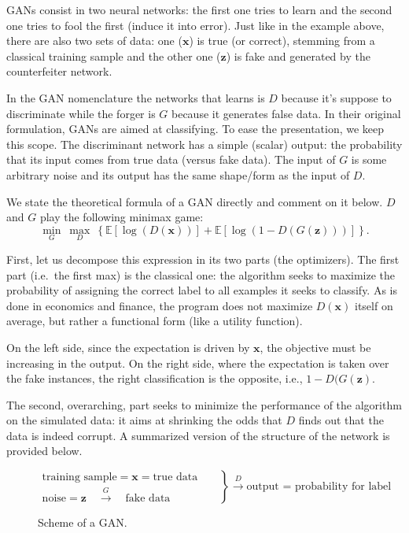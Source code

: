 \documentclass[]{krantz}
\theoremstyle{definition}
\theoremstyle{definition}
\theoremstyle{definition}
\theoremstyle{remark}
\begin{document}
GANs consist in two neural networks: the first one tries to learn and
the second one tries to fool the first (induce it into error). Just like
in the example above, there are also two sets of data: one
(\(\textbf{x}\)) is true (or correct), stemming from a classical
training sample and the other one (\(\textbf{z}\)) is fake and generated
by the counterfeiter network.

In the GAN nomenclature the networks that learns is \(D\) because it's
suppose to discriminate while the forger is \(G\) because it generates
false data. In their original formulation, GANs are aimed at
classifying. To ease the presentation, we keep this scope. The
discriminant network has a simple (scalar) output: the probability that
its input comes from true data (versus fake data). The input of \(G\) is
some arbitrary noise and its output has the same shape/form as the input
of \(D\).

We state the theoretical formula of a GAN directly and comment on it
below. \(D\) and \(G\) play the following minimax game: \begin{equation}
\label{eq:GAN}
\underset{G}{\min} \ \underset{D}{\max} \ \left\{ \mathbb{E}[\log(D(\textbf{x}))]+\mathbb{E}[\log(1-D(G(\textbf{z})))] \right\}.
\end{equation}

First, let us decompose this expression in its two parts (the
optimizers). The first part (i.e.~the first max) is the classical one:
the algorithm seeks to maximize the probability of assigning the correct
label to all examples it seeks to classify. As is done in economics and
finance, the program does not maximize \(D(\textbf{x})\) itself on
average, but rather a functional form (like a utility function).

On the left side, since the expectation is driven by \(\textbf{x}\), the
objective must be increasing in the output. On the right side, where the
expectation is taken over the fake instances, the right classification
is the opposite, i.e., \(1-D(G(\textbf{z})\).

The second, overarching, part seeks to minimize the performance of the
algorithm on the simulated data: it aims at shrinking the odds that
\(D\) finds out that the data is indeed corrupt. A summarized version of
the structure of the network is provided below.

\begin{figure}
$$\left. \begin{array}{rlll} 
\text{training sample}  = \textbf{x} = \text{true data} && \\
\text{noise}= \textbf{z} \quad \overset{G}{\rightarrow} \quad  \text{fake data}  &
\end{array} \right\} \overset{D}{\rightarrow} \text{output = probability for label}
$$  \vspace{-3mm}
\caption{Scheme of a GAN.}
\end{figure}
\end{document}
